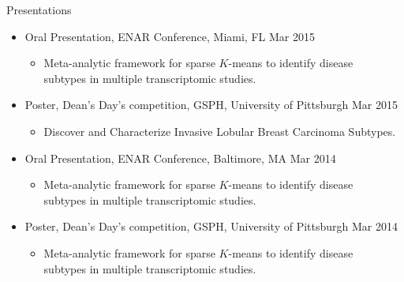 \documentclass{resume} %
\begin{document}
\begin{rSection}{Presentations}
\begin{itemize}[noitemsep,topsep=0pt]
\item Oral Presentation, ENAR Conference, Miami, FL \hfill {Mar 2015}
\begin{itemize}[noitemsep,topsep=0pt]
\item{Meta-analytic framework for sparse $K$-means to identify disease\\ subtypes in multiple transcriptomic studies.}
\end{itemize}

\item Poster, Dean's Day's competition, GSPH, University of Pittsburgh \hfill {Mar 2015}
\begin{itemize}[noitemsep,topsep=0pt]
\item{Discover and Characterize Invasive Lobular Breast Carcinoma Subtypes.}
\end{itemize}

\item Oral Presentation, ENAR Conference, Baltimore, MA \hfill {Mar 2014}
\begin{itemize}[noitemsep,topsep=0pt]
\item{Meta-analytic framework for sparse $K$-means to identify disease\\ subtypes in multiple transcriptomic studies.}
\end{itemize}

\item Poster, Dean's Day's competition, GSPH, University of Pittsburgh \hfill {Mar 2014}
\begin{itemize}[noitemsep,topsep=0pt]
\item{Meta-analytic framework for sparse $K$-means to identify disease \\ subtypes in multiple transcriptomic studies.}
\end{itemize}
\end{itemize}



\end{rSection}

\end{document}
